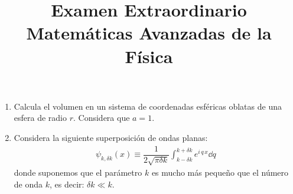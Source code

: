 \documentclass[12pt]{article}
\title{Examen Extraordinario\\ \large{Matemáticas Avanzadas de la Física} \vspace{-50pt}}
\date{}
\numberwithin{equation}{section}
\renewcommand{\labelenumii}{\theenumii}
\renewcommand{\theenumii}{\theenumi.\arabic{enumii}.}
\begin{document}
\renewcommand\labelenumii{\theenumi.{\arabic{enumii})}}
\maketitle
\fontsize{14}{14}\selectfont
\begin{enumerate}
\item Calcula el volumen en un sistema de coordenadas esféricas oblatas de una esfera de radio $r$. Considera que $a = 1$.
\item Considera la siguiente superposición de ondas planas:
\begin{align*}
\psi_{k, \delta k} (x) \equiv \dfrac{1}{2 \sqrt{\pi \delta k}} \int_{k -\delta k}^{k + \delta k} e^{i \, q \, x} \dd{q}
\end{align*}
donde suponemos que el parámetro $k$ es mucho más pequeño que el número de onda $k$, es decir: $\delta k \ll k$.


\end{enumerate}
\end{document}
